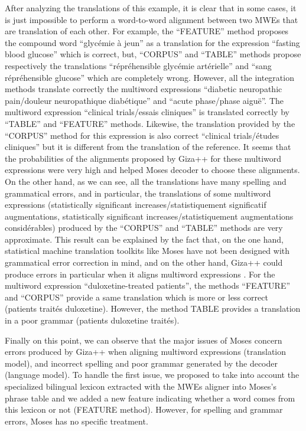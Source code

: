 \documentclass[output=paper,modfonts,nonflat]{langsci/langscibook}
\begin{document}
After analyzing the translations of this example, it is clear that in some cases, it is just impossible to perform a word-to-word alignment between two MWEs that are translation of each other. For example, the ``FEATURE'' method proposes the compound word “glycémie à jeun” as a translation for the expression “fasting blood glucose” which is correct, but, ``CORPUS'' and ``TABLE'' methods propose respectively the translations “répréhensible glycémie artérielle” and “sang répréhensible glucose” which are completely wrong. However, all the integration methods translate correctly the multiword expressions “diabetic neuropath\-ic pain/douleur neuropathique diabétique” and “acute phase/phase aiguë”. The multiword expression “clinical trials/essais cliniques” is translated correctly by ``TABLE'' and ``FEATURE'' methods. Likewise, the translation provided by the ``CORPUS'' method for this expression is also correct “clinical trials/études cliniques” but it is different from the translation of the reference. It seems that the probabilities of the alignments proposed by Giza++ for these multiword expressions were very high and helped Moses decoder to choose these alignments. On the other hand, as we can see, all the translations have many spelling and grammatical errors, and in particular, the translations of some multiword expressions (statistically significant increases/statistiquement significatif augmentations, statistically significant increases/statistiquement augmentations considérables) produced by the ``CORPUS'' and ``TABLE'' methods are very approximate. This result can be explained by the fact that, on the one hand, statistical machine translation toolkits like Moses have not been designed with grammatical error correction in mind, and on the other hand, Giza++ could produce errors in particular when it aligns multiword expressions  \citep{fraser2007measuring}. For the multiword expression “duloxetine-treated patients”, the methods ``FEATURE'' and ``CORPUS'' provide a same translation which is more or less correct (patients traités duloxetine). However, the method TABLE provides a translation in a poor grammar (patients duloxetine traités).

Finally on this point, we can observe that the major issues of Moses concern errors produced by Giza++ when aligning multiword expressions (translation model), and incorrect spelling and poor grammar generated by the decoder (language model). To handle the first issue, we proposed to take into account the specialized bilingual lexicon extracted with the MWEs aligner into Moses’s phrase table and we added a new feature indicating whether a word comes from this lexicon or not (FEATURE method). However, for spelling and grammar errors, Moses has no specific treatment.
\end{document}
